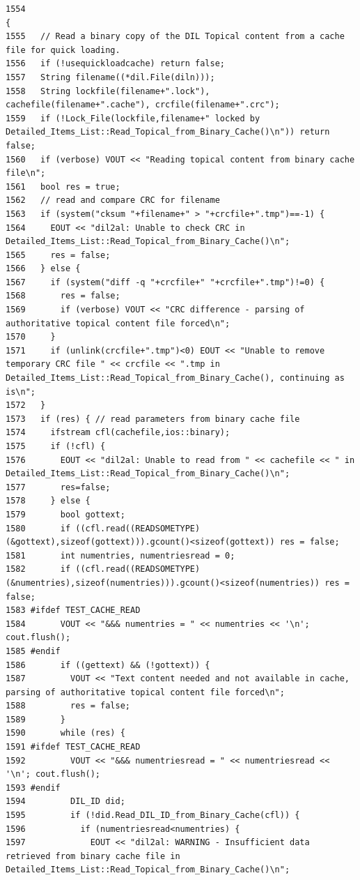 \footnotesize\begin{verbatim}1554                                                                                {
1555   // Read a binary copy of the DIL Topical content from a cache file for quick loading.
1556   if (!usequickloadcache) return false;
1557   String filename((*dil.File(diln)));
1558   String lockfile(filename+".lock"), cachefile(filename+".cache"), crcfile(filename+".crc");
1559   if (!Lock_File(lockfile,filename+" locked by Detailed_Items_List::Read_Topical_from_Binary_Cache()\n")) return false;
1560   if (verbose) VOUT << "Reading topical content from binary cache file\n";
1561   bool res = true;
1562   // read and compare CRC for filename
1563   if (system("cksum "+filename+" > "+crcfile+".tmp")==-1) {
1564     EOUT << "dil2al: Unable to check CRC in Detailed_Items_List::Read_Topical_from_Binary_Cache()\n";
1565     res = false;
1566   } else {
1567     if (system("diff -q "+crcfile+" "+crcfile+".tmp")!=0) {
1568       res = false;
1569       if (verbose) VOUT << "CRC difference - parsing of authoritative topical content file forced\n";
1570     }
1571     if (unlink(crcfile+".tmp")<0) EOUT << "Unable to remove temporary CRC file " << crcfile << ".tmp in Detailed_Items_List::Read_Topical_from_Binary_Cache(), continuing as is\n";
1572   }
1573   if (res) { // read parameters from binary cache file
1574     ifstream cfl(cachefile,ios::binary);
1575     if (!cfl) {
1576       EOUT << "dil2al: Unable to read from " << cachefile << " in Detailed_Items_List::Read_Topical_from_Binary_Cache()\n";
1577       res=false;
1578     } else {
1579       bool gottext;
1580       if ((cfl.read((READSOMETYPE) (&gottext),sizeof(gottext))).gcount()<sizeof(gottext)) res = false;
1581       int numentries, numentriesread = 0;
1582       if ((cfl.read((READSOMETYPE) (&numentries),sizeof(numentries))).gcount()<sizeof(numentries)) res = false;
1583 #ifdef TEST_CACHE_READ
1584       VOUT << "&&& numentries = " << numentries << '\n'; cout.flush();
1585 #endif
1586       if ((gettext) && (!gottext)) {
1587         VOUT << "Text content needed and not available in cache, parsing of authoritative topical content file forced\n";
1588         res = false;
1589       }
1590       while (res) {
1591 #ifdef TEST_CACHE_READ
1592         VOUT << "&&& numentriesread = " << numentriesread << '\n'; cout.flush();
1593 #endif
1594         DIL_ID did;
1595         if (!did.Read_DIL_ID_from_Binary_Cache(cfl)) {
1596           if (numentriesread<numentries) {
1597             EOUT << "dil2al: WARNING - Insufficient data retrieved from binary cache file in Detailed_Items_List::Read_Topical_from_Binary_Cache()\n";

\end{verbatim}
